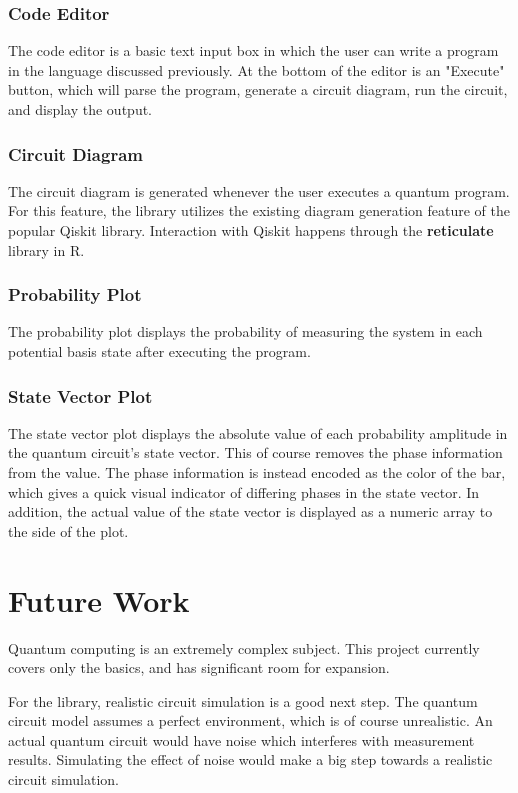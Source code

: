 \documentclass{article}
\begin{document}
\subsubsection{Code Editor}
The code editor is a basic text input box in which the user can write a program in the language discussed previously. At the bottom of the editor is an "Execute" button, which will parse the program, generate a circuit diagram, run the circuit, and display the output.

\subsubsection{Circuit Diagram}
The circuit diagram is generated whenever the user executes a quantum program. For this feature, the library utilizes the existing diagram generation feature of the popular Qiskit library. Interaction with Qiskit happens through the \textbf{reticulate} library in R.

\subsubsection{Probability Plot}
The probability plot displays the probability of measuring the system in each potential basis state after executing the program.

\subsubsection{State Vector Plot}
The state vector plot displays the absolute value of each probability amplitude in the quantum circuit's state vector. This of course removes the phase information from the value. The phase information is instead encoded as the color of the bar, which gives a quick visual indicator of differing phases in the state vector. In addition, the actual value of the state vector is displayed as a numeric array to the side of the plot.


\section{Future Work}
Quantum computing is an extremely complex subject. This project currently covers only the basics, and has significant room for expansion.

For the library, realistic circuit simulation is a good next step. The quantum circuit model assumes a perfect environment, which is of course unrealistic. An actual quantum circuit would have noise which interferes with measurement results. Simulating the effect of noise would make a big step towards a realistic circuit simulation.
\end{document}
